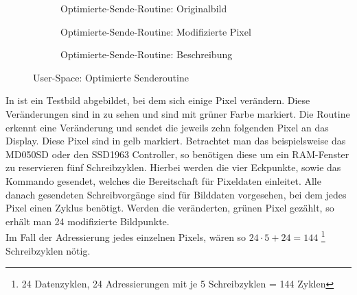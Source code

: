 \begin{figure}[htp]
        \begin{center}
        \begin{subfigure}[htp]{0.8\textwidth}
			\centering
			\caption{Optimierte-Sende-Routine: Originalbild}
			\label{fig:optimierte_routine_original}
		\end{subfigure}


        \begin{subfigure}[htp]{0.8\textwidth}
	\centering
{}
	\caption{Optimierte-Sende-Routine: Modifizierte Pixel}
	\label{fig:optimierte_routine_mod}
\end{subfigure}


        \begin{subfigure}[htp]{0.8\textwidth}
	\centering
{}
	\caption{Optimierte-Sende-Routine: Beschreibung}
	\label{fig:optimierte_routine_desc}
\end{subfigure}
		\end{center}
\caption{User-Space: Optimierte Senderoutine}
\end{figure}
In  ist ein Testbild abgebildet, bei dem sich einige Pixel verändern. Diese Veränderungen sind in  zu sehen und sind mit grüner Farbe markiert. Die Routine erkennt eine Veränderung und sendet die jeweils zehn folgenden Pixel an das Display. Diese Pixel sind in  gelb markiert. 
Betrachtet man das beispielsweise das MD050SD oder den SSD1963 Controller, so benötigen diese um ein RAM-Fenster zu reservieren fünf Schreibzyklen. Hierbei werden die vier Eckpunkte, sowie das Kommando gesendet, welches die Bereitschaft für Pixeldaten einleitet. Alle danach gesendeten Schreibvorgänge sind für Bilddaten vorgesehen, bei dem jedes Pixel einen Zyklus benötigt. Werden die veränderten, grünen Pixel gezählt, so erhält man 24 modifizierte Bildpunkte.\\
Im Fall der Adressierung jedes einzelnen Pixels, wären so $24 \cdot 5 + 24 = 144$ \footnote{24 Datenzyklen, 24 Adressierungen mit je 5 Schreibzyklen = 144 Zyklen} Schreibzyklen nötig. \\
